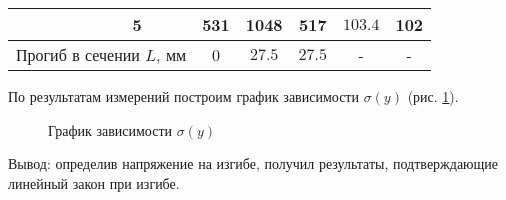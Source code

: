 \begin{table}[!ht]
\begin{tabular}{|c|c|c|c|c|c|c|}
                                                                                        & 5                                                         & 531                   & 1048                              & 517                                                                & $103.4$                          & 102    \\ \hline
        \multicolumn{2}{|l|}{Прогиб в сечении $L$, мм}                                                                                              & 0                     & $27.5$                            & $27.5$                                                             &  -                               & - {}   \\ \hline

    \end{tabular}
\end{table}

По результатам измерений построим график зависимости $\sigma(y)$ (рис. \ref{fig:graph}).
\begin{figure}[!ht]
    \centering
    \caption{График зависимости $\sigma(y)$}
    \label{fig:graph}
\end{figure}

Вывод: определив напряжение на изгибе, получил результаты, подтверждающие линейный закон при изгибе.
